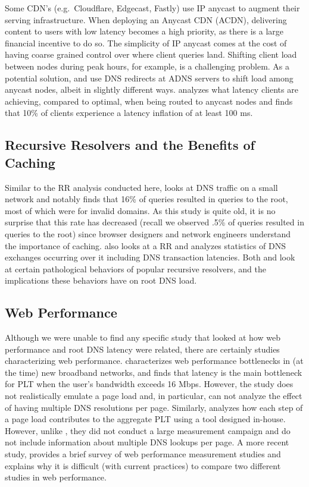 \documentclass[sigconf,nonacm,10pt]{acmart}
\begin{document}
Some CDN's (e.g.~Cloudflare, Edgecast, Fastly) use IP anycast to augment
their serving infrastructure. When deploying an Anycast CDN (ACDN),
delivering content to users with low latency becomes a high priority, as
there is a large financial incentive to do so. The simplicity of IP
anycast comes at the cost of having coarse grained control over where
client queries land. Shifting client load between nodes during peak
hours, for example, is a challenging problem. As a potential solution,
\cite{flavel2015fastroute} and \cite{alzoubi2011practical} use DNS
redirects at ADNS servers to shift load among anycast nodes, albeit in
slightly different ways. \cite{calder2015analyzing} analyzes what
latency clients are achieving, compared to optimal, when being routed to
anycast nodes and finds that 10\% of clients experience a latency
inflation of at least 100 ms.

\subsection{Recursive Resolvers and the Benefits of
Caching}\label{recursive-resolvers-and-the-benefits-of-caching}

Similar to the RR analysis conducted here, \cite{jung2002dns} looks at
DNS traffic on a small network and notably finds that 16\% of queries
resulted in queries to the root, most of which were for invalid domains.
As this study is quite old, it is no surprise that this rate has
decreased (recall we observed .5\% of queries resulted in queries to the
root) since browser designers and network engineers understand the
importance of caching. \cite{callahan2013modern} also looks at a RR and
analyzes statistics of DNS exchanges occurring over it including DNS
transaction latencies. Both \cite{lentz2013d} and \cite{yu2012authority}
look at certain pathological behaviors of popular recursive resolvers,
and the implications these behaviors have on root DNS load.

\subsection{Web Performance}\label{web-performance}

Although we were unable to find any specific study that looked at how
web performance and root DNS latency were related, there are certainly
studies characterizing web performance. \cite{sundaresan2013web}
characterizes web performance bottlenecks in (at the time) new broadband
networks, and finds that latency is the main bottleneck for PLT when the
user's bandwidth exceeds 16 Mbps. However, the study does not
realistically emulate a page load and, in particular, can not analyze
the effect of having multiple DNS resolutions per page. Similarly,
\cite{asrese2016wepr} analyzes how each step of a page load contributes
to the aggregate PLT using a tool designed in-house. However, unlike
\cite{sundaresan2013web}, they did not conduct a large measurement
campaign and do not include information about multiple DNS lookups per
page. A more recent study, \cite{enghardt2019web} provides a brief
survey of web performance measurement studies and explains why it is
difficult (with current practices) to compare two different studies in
web performance.
\end{document}

